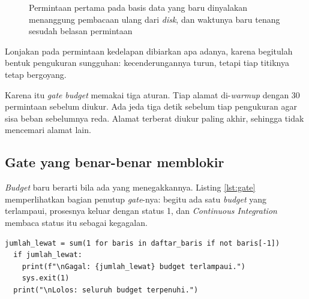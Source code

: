 \begin{figure}[!htb]
  \centering
  \caption{Permintaan pertama pada basis data yang baru dinyalakan menanggung
           pembacaan ulang dari \textit{disk}, dan waktunya baru tenang
           sesudah belasan permintaan}
  \label{fig:warmup}
\end{figure}

Lonjakan pada permintaan kedelapan dibiarkan apa adanya, karena begitulah
bentuk pengukuran sungguhan: kecenderungannya turun, tetapi tiap titiknya
tetap bergoyang.

Karena itu \textit{gate} \textit{budget} memakai tiga aturan. Tiap alamat di-\textit{warmup}
dengan 30 permintaan sebelum diukur. Ada jeda tiga detik sebelum tiap
pengukuran agar sisa beban sebelumnya reda. Alamat terberat diukur paling
akhir, sehingga tidak mencemari alamat lain.

\subsection*{Gate yang benar-benar memblokir}

\textit{Budget} baru berarti bila ada yang menegakkannya. Listing \ref{lst:gate}
memperlihatkan bagian penutup \textit{gate}-nya: begitu ada satu \textit{budget} yang
terlampaui, prosesnya keluar dengan status 1, dan \textit{Continuous
Integration} membaca status itu sebagai kegagalan.

\begin{lstlisting}[style=PythonStyle, caption={Status keluar yang memblokir merge, tersedia di \berkas{sources/chapter05/gate-budget.py}}, label={lst:gate}]
  jumlah_lewat = sum(1 for baris in daftar_baris if not baris[-1])
  if jumlah_lewat:
    print(f"\nGagal: {jumlah_lewat} budget terlampaui.")
    sys.exit(1)
  print("\nLolos: seluruh budget terpenuhi.")
\end{lstlisting}

